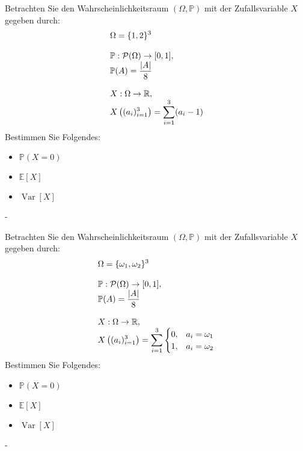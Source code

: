 \documentclass{article}
\begin{document}
\begin{problem}
Betrachten Sie den Wahrscheinlichkeitsraum $(\Omega, \mathbb{P})$ mit der Zufallsvariable $X$ gegeben durch:
\[
\begin{array}{>{\displaystyle}l}
\Omega = \{1, 2\}^3 \\
\\
\mathbb{P}: \mathcal{P}(\Omega) \to [0, 1], \\
\mathbb{P}(A) = \frac{|A|}{8} \\
\\
X: \Omega \to \mathbb{R}, \\
X \left( (a_i)_{i = 1}^3 \right) = \sum_{i = 1}^3 (a_i - 1)
\end{array}
\]
Bestimmen Sie Folgendes:
\begin{itemize}
\item $\mathbb{P}(X = 0)$
\item $\mathbb{E}[X]$
\item $\operatorname{Var}[X]$
\end{itemize}
\end{problem}

\begin{solution}
-
\end{solution}

\begin{problem}
Betrachten Sie den Wahrscheinlichkeitsraum $(\Omega, \mathbb{P})$ mit der Zufallsvariable $X$ gegeben durch:
\[
\begin{array}{>{\displaystyle}l}
\Omega = \{\omega_1, \omega_2\}^3 \\
\\
\mathbb{P}: \mathcal{P}(\Omega) \to [0, 1], \\
\mathbb{P}(A) = \frac{|A|}{8} \\
\\
X: \Omega \to \mathbb{R}, \\
X \left( (a_i)_{i = 1}^3 \right) = \sum_{i = 1}^3 \begin{cases} 0, & a_i = \omega_1 \\ 1, & a_i = \omega_2 \\ \end{cases}
\end{array}
\]
Bestimmen Sie Folgendes:
\begin{itemize}
\item $\mathbb{P}(X = 0)$
\item $\mathbb{E}[X]$
\item $\operatorname{Var}[X]$
\end{itemize}
\end{problem}

\begin{solution}
-
\end{solution}
\end{document}
